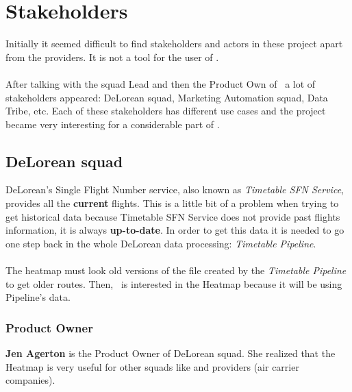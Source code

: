 
\chapter{Stakeholders}

\label{chapter04}


Initially it seemed difficult to find stakeholders and actors in these project apart from the providers. It is not a tool for the user of \company.
\\\\
After talking with the squad Lead and then the Product Own of \squad\ a lot of stakeholders appeared: DeLorean squad, Marketing Automation squad, Data Tribe, etc. Each of these stakeholders has different use cases and the project became very interesting for a considerable part of \company.

\section{DeLorean squad} \label{dlr}

DeLorean's Single Flight Number service, also known as \textit{Timetable SFN Service}, provides all the \textbf{current} flights. This is a little bit of a problem when trying to get historical data because Timetable SFN Service does not provide past flights information, it is always \textbf{up-to-date}. In order to get this data it is needed to go one step back in the whole DeLorean data processing: \textit{Timetable Pipeline}.
\\\\
The heatmap must look old versions of the file created by the \textit{Timetable Pipeline} to get older routes. Then, \squad\ is interested in the Heatmap because it will be using Pipeline's data.

\subsection*{Product Owner} \label{product_owner}

\textbf{Jen Agerton} is the Product Owner of DeLorean squad. She realized that the Heatmap is very useful for other squads like  and providers (air carrier companies).


